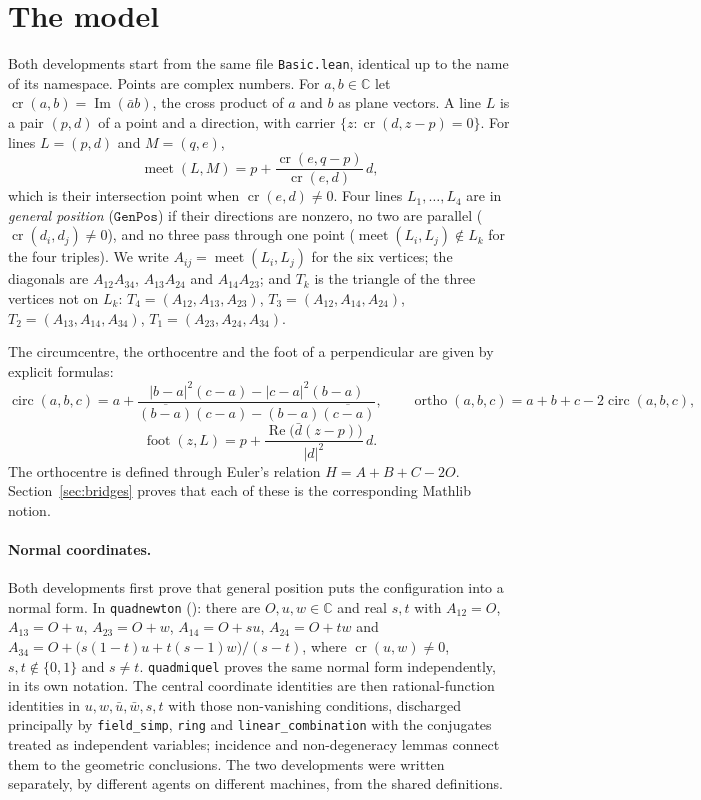\documentclass[11pt]{article}
\theoremstyle{definition}
\theoremstyle{remark}
\newcommand{\lean}[1]{\texttt{#1}}
\newcommand{\CC}{\mathbb{C}}
\begin{document}
\section{The model}\label{sec:model}

Both developments start from the same file \lean{Basic.lean}, identical up to the name of its
namespace. Points are complex numbers. For $a,b\in\CC$ let $\operatorname{cr}(a,b)=\operatorname{Im}(\bar a b)$,
the cross product of $a$ and $b$ as plane vectors. A line $L$ is a pair $(p,d)$ of a point and a
direction, with carrier $\{z:\operatorname{cr}(d,z-p)=0\}$. For lines $L=(p,d)$ and $M=(q,e)$,
\[
  \operatorname{meet}(L,M)=p+\frac{\operatorname{cr}(e,q-p)}{\operatorname{cr}(e,d)}\,d ,
\]
which is their intersection point when $\operatorname{cr}(e,d)\neq0$. Four lines $L_1,\dots,L_4$ are in
\emph{general position} ($\lean{GenPos}$) if their directions are nonzero, no two are parallel
($\operatorname{cr}(d_i,d_j)\ne0$), and no three pass through one point
($\operatorname{meet}(L_i,L_j)\notin L_k$ for the four triples). We write $A_{ij}=\operatorname{meet}(L_i,L_j)$
for the six vertices; the diagonals are $A_{12}A_{34}$, $A_{13}A_{24}$ and $A_{14}A_{23}$; and
$T_k$ is the triangle of the three vertices not on $L_k$: $T_4=(A_{12},A_{13},A_{23})$,
$T_3=(A_{12},A_{14},A_{24})$, $T_2=(A_{13},A_{14},A_{34})$, $T_1=(A_{23},A_{24},A_{34})$.

The circumcentre, the orthocentre and the foot of a perpendicular are given by explicit formulas:
\[
  \operatorname{circ}(a,b,c)=a+\frac{|b-a|^2(c-a)-|c-a|^2(b-a)}{\overline{(b-a)}(c-a)-(b-a)\overline{(c-a)}},\qquad
  \operatorname{ortho}(a,b,c)=a+b+c-2\operatorname{circ}(a,b,c),
\]
\[
  \operatorname{foot}(z,L)=p+\frac{\operatorname{Re}\big(\bar d(z-p)\big)}{|d|^2}\,d .
\]
The orthocentre is defined through Euler's relation $H=A+B+C-2O$. Section~\ref{sec:bridges} proves
that each of these is the corresponding Mathlib notion.

\paragraph{Normal coordinates.} Both developments first prove that general position puts the
configuration into a normal form. In \lean{quadnewton} (): there are
$O,u,w\in\CC$ and real $s,t$ with $A_{12}=O$, $A_{13}=O+u$, $A_{23}=O+w$, $A_{14}=O+su$,
$A_{24}=O+tw$ and $A_{34}=O+\big(s(1-t)u+t(s-1)w\big)/(s-t)$, where $\operatorname{cr}(u,w)\neq0$,
$s,t\notin\{0,1\}$ and $s\neq t$. \lean{quadmiquel} proves the same normal form independently, in its own
notation. The central coordinate identities are then rational-function identities in
$u,w,\bar u,\bar w,s,t$ with those non-vanishing conditions, discharged principally by
\lean{field\_simp}, \lean{ring} and \lean{linear\_combination} with the conjugates treated as
independent variables; incidence and non-degeneracy lemmas connect them to the geometric conclusions. The two developments were written separately, by different agents on different
machines, from the shared definitions.
\end{document}
